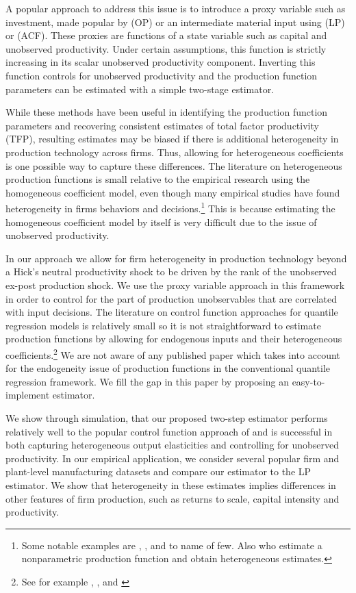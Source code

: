 \documentclass[11pt]{article}
\begin{document}
A popular approach to address this issue is to introduce a proxy variable such as investment, made popular by \cite{Olley1996} (OP) or an intermediate material input using \cite{Levinsohn2003} (LP) or \cite{Ackerberg2015} (ACF). These proxies are functions of a state variable such as capital and unobserved productivity. Under certain assumptions, this function is strictly increasing in its scalar unobserved productivity component. Inverting this function controls for unobserved productivity and the production function parameters can be estimated with a simple two-stage estimator.

While these methods have been useful in identifying the production function parameters and recovering consistent estimates of total factor productivity (TFP), resulting estimates may be biased if there is additional heterogeneity in production technology across firms. Thus, allowing for heterogeneous coefficients is one possible way to capture these differences. The literature on heterogeneous production functions is small relative to the empirical research using the homogeneous coefficient model, even though many empirical studies have found heterogeneity in firms behaviors and decisions.\footnote{Some notable examples are \cite*{Kasahara2015}, \cite*{balat}, \cite*{Li2017} and \cite*{mert} to name of few. Also \cite{Gandhi2020} who estimate a nonparametric production function and obtain heterogeneous estimates.} This is because estimating the homogeneous coefficient model by itself is very difficult due to the issue of unobserved productivity. 

In our approach we allow for firm heterogeneity in production technology beyond a Hick's neutral productivity shock to be driven by the rank of the unobserved ex-post production shock.  We use the proxy variable approach in this framework in order to control for the part of production unobservables that are correlated with input decisions. The literature on control function approaches for quantile regression models is relatively small so it is not straightforward to estimate production functions by allowing for endogenous inputs and their heterogeneous coefficients.\footnote{See for example \cite{Chesher2003}, \cite{Ma2006}, \cite{Lee2007} and \cite{2009a}} We are not aware of any published paper which takes into account for the endogeneity issue of production functions in the conventional quantile regression framework. We fill the gap in this paper by proposing an easy-to-implement estimator.

We show through simulation, that our proposed two-step estimator performs relatively well to the popular control function approach of \cite{Levinsohn2003} and is successful in both capturing heterogeneous output elasticities and controlling for unobserved productivity. In our empirical application, we consider several popular firm and plant-level manufacturing datasets and compare our estimator to the LP estimator. We show that heterogeneity in these estimates implies differences in other features of firm production, such as returns to scale, capital intensity and productivity.
\end{document}
